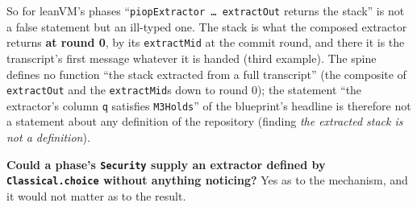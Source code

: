 So for leanVM's phases \enquote{\texttt{piopExtractor … extractOut} returns the stack} is not a false statement but an ill-typed one. The stack is what the composed extractor returns \textbf{at round 0}, by its \texttt{extractMid} at the commit round, and there it is the transcript's first message whatever it is handed (third example). The spine defines no function \enquote{the stack extracted from a full transcript} (the composite of \texttt{extractOut} and the \texttt{extractMid}s down to round 0); the statement \enquote{the extractor's column \texttt{q} satisfies \texttt{M3Holds}} of the blueprint's headline is therefore not a statement about any definition of the repository (finding \emph{the extracted stack is not a definition}).

\textbf{Could a phase's \texttt{Security} supply an extractor defined by \texttt{Classical.\allowbreak{}choice} without anything noticing?} Yes as to the mechanism, and it would not matter as to the result.

